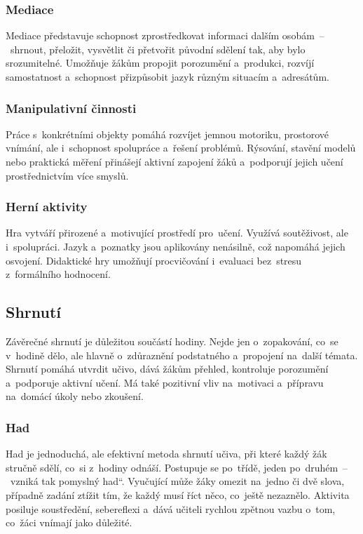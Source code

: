 \documentclass[male,czech,api_bc]{kitheses}
\begin{document}
\subsubsection{Mediace}

Mediace představuje schopnost zprostředkovat informaci dalším osobám~--~shrnout, přeložit, vysvětlit či přetvořit původní sdělení tak, aby bylo srozumitelné. Umožňuje žákům propojit porozumění a~produkci, rozvíjí samostatnost a~schopnost přizpůsobit jazyk různým situacím a~adresátům.\cite{eduMediace}

\subsubsection{Manipulativní činnosti}

Práce s~konkrétními objekty pomáhá rozvíjet jemnou motoriku, prostorové vnímání, ale i~schopnost spolupráce a~řešení problémů. Rýsování, stavění modelů nebo praktická měření přinášejí aktivní zapojení žáků a~podporují jejich učení prostřednictvím více smyslů.\cite{eduManipulativniCinnosti}

\subsubsection{Herní aktivity}

Hra vytváří přirozené a~motivující prostředí pro~učení. Využívá soutěživost, ale i~spolupráci. Jazyk a~poznatky jsou aplikovány nenásilně, což napomáhá jejich osvojení. Didaktické hry umožňují procvičování i~evaluaci bez~stresu z~formálního hodnocení.\cite{eduHra}

\subsection{Shrnutí}

Závěrečné shrnutí je důležitou součástí hodiny. Nejde jen o~zopakování, co~se v~hodině dělo, ale hlavně o~zdůraznění podstatného a~propojení na~další témata. Shrnutí pomáhá utvrdit učivo, dává žákům přehled, kontroluje porozumění a~podporuje aktivní učení. Má také pozitivní vliv na~motivaci a~přípravu na~domácí úkoly nebo zkoušení.\cite{eduShrnuti}

\subsubsection{Had}

Had je jednoduchá, ale efektivní metoda shrnutí učiva, při které každý žák stručně sdělí, co~si z~hodiny odnáší. Postupuje se po~třídě, jeden po~druhém~--~vzniká tak pomyslný \quotedblbase had``. Vyučující může žáky omezit na~jedno či dvě slova, případně zadání ztížit tím, že každý musí říct něco, co~ještě nezaznělo. Aktivita posiluje soustředění, sebereflexi a~dává učiteli rychlou zpětnou vazbu o~tom, co~žáci vnímají jako důležité.\cite{eduHad}
\end{document}

